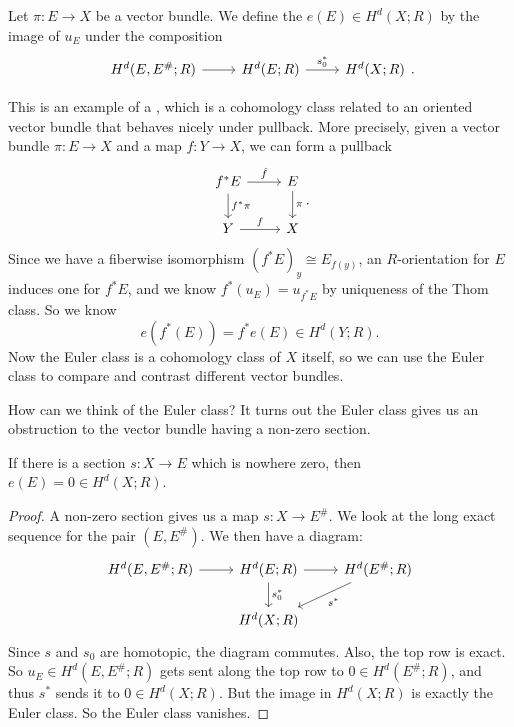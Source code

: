 \documentclass[a4paper]{article}
\theoremstyle{definition}
\begin{document}
\begin{defi}
  Let $\pi: E \to X$ be a vector bundle. We define the  $e(E) \in H^d(X; R)$ by the image of $u_E$ under the composition
  \[
    \begin{tikzcd}
      H^d(E, E^\#; R) \ar[r] & H^d(E; R) \ar[r, "s_0^*"] & H^d(X; R)
    \end{tikzcd}.
  \]
\end{defi}
This is an example of a , which is a cohomology class related to an oriented vector bundle that behaves nicely under pullback. More precisely, given a vector bundle $\pi: E \to X$ and a map $f: Y \to X$, we can form a pullback
\[
  \begin{tikzcd}
    f^*E \ar[r, "\hat{f}"] \ar[d, "f^*\pi"] & E \ar[d, "\pi"]\\
    Y \ar[r, "f"] & X
  \end{tikzcd}.
\]
Since we have a fiberwise isomorphism $(f^*E)_y \cong E_{f(y)}$, an $R$-orientation for $E$ induces one for $f^* E$, and we know $f^*(u_E) = u_{f^* E}$ by uniqueness of the Thom class. So we know
\[
  e(f^*(E)) = f^* e(E) \in H^d(Y; R).
\]
Now the Euler class is a cohomology class of $X$ itself, so we can use the Euler class to compare and contrast different vector bundles.

How can we think of the Euler class? It turns out the Euler class gives us an obstruction to the vector bundle having a non-zero section.
\begin{thm}
  If there is a section $s: X \to E$ which is nowhere zero, then $e(E) = 0 \in H^d(X; R)$.
\end{thm}

\begin{proof}
  A non-zero section gives us a map $s: X \to E^\#$. We look at the long exact sequence for the pair $(E, E^\#)$. We then have a diagram:
  \[
    \begin{tikzcd}
      H^d(E, E^\#; R) \ar[r] & H^d(E; R) \ar[r] \ar[d, "s_0^*"] & H^d(E^\#; R) \ar[dl, "s^*"]\\
      & H^d(X; R)
    \end{tikzcd}
  \]
  Since $s$ and $s_0$ are homotopic, the diagram commutes. Also, the top row is exact. So $u_E \in H^d(E, E^\#; R)$ gets sent along the top row to $0 \in H^d(E^\#; R)$, and thus $s^*$ sends it to $0 \in H^d(X; R)$. But the image in $H^d(X; R)$ is exactly the Euler class. So the Euler class vanishes.
\end{proof}
\end{document}
